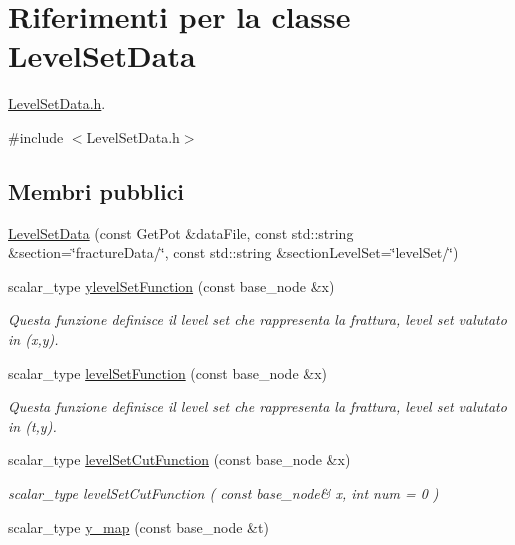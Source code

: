 \hypertarget{classLevelSetData}{\section{Riferimenti per la classe Level\-Set\-Data}
\label{classLevelSetData}
}


\hyperlink{LevelSetData_8h}{Level\-Set\-Data.\-h}.  




{\ttfamily \#include $<$Level\-Set\-Data.\-h$>$}

\subsection*{Membri pubblici}
\begin{DoxyCompactItemize}
\item 
\hyperlink{classLevelSetData_a8b2ab7808f47d9a951327891d65e84be}{Level\-Set\-Data} (const Get\-Pot \&data\-File, const std\-::string \&section=\char`\"{}fracture\-Data/\char`\"{}, const std\-::string \&section\-Level\-Set=\char`\"{}level\-Set/\char`\"{})
\item 
scalar\-\_\-type \hyperlink{classLevelSetData_a732ae59581206d4f94237e54bc0071e3}{ylevel\-Set\-Function} (const base\-\_\-node \&x)
\begin{DoxyCompactList}\small\item\em Questa funzione definisce il level set che rappresenta la frattura, level set valutato in (x,y). \end{DoxyCompactList}\item 
scalar\-\_\-type \hyperlink{classLevelSetData_a665241939c12bad26face4d997e655ce}{level\-Set\-Function} (const base\-\_\-node \&x)
\begin{DoxyCompactList}\small\item\em Questa funzione definisce il level set che rappresenta la frattura, level set valutato in (t,y). \end{DoxyCompactList}\item 
scalar\-\_\-type \hyperlink{classLevelSetData_a60ea6aa9991dfdae4e4a3950ed8db66c}{level\-Set\-Cut\-Function} (const base\-\_\-node \&x)
\begin{DoxyCompactList}\small\item\em scalar\-\_\-type level\-Set\-Cut\-Function ( const base\-\_\-node\& x, int num = 0 ) \end{DoxyCompactList}\item 
scalar\-\_\-type \hyperlink{classLevelSetData_aa4cda1cced4bc385d85383b40bbc2631}{y\-\_\-map} (const base\-\_\-node \&t)

\end{DoxyCompactItemize}
